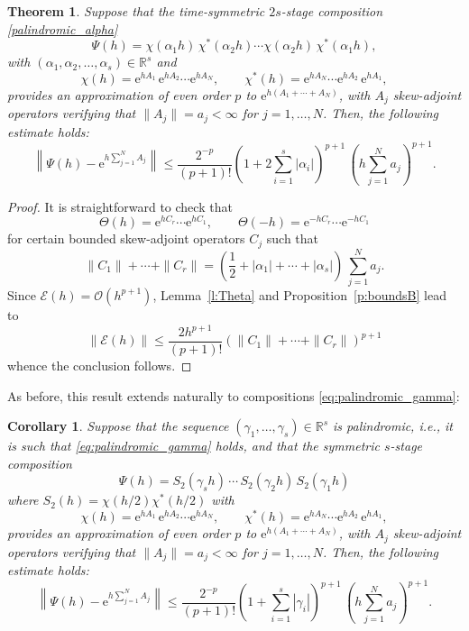 \documentclass[11pt]{article}
\newcommand{\e}{\ensuremath{\mathrm{e}}}
\newtheorem{theorem}[lemma]{Theorem}
\newtheorem{corollary}[lemma]{Corollary}
\begin{document}
\begin{theorem} \label{th_compo}
Suppose that the time-symmetric $2s$-stage composition \eqref{palindromic_alpha} 
\[
   \Psi(h) = \chi(\alpha_{1} h) \, \chi^*(\alpha_{2} h) \cdots \chi(\alpha_2 h) \, \chi^*(\alpha_1 h), 
\]
with $(\alpha_1, \alpha_2, \ldots, \alpha_s) \in \mathbb{R}^s$ and
\[
  \chi(h) = \e^{h A_1} \, \e^{h A_2} \cdots \e^{h A_N}, \qquad \chi^*(h) = \e^{h A_N} \cdots \e^{h A_2} \, \e^{h A_1}, 
\]
 provides an approximation of even order $p$ to $\e^{h(A_1 + \cdots + A_N)}$,
with $A_j$ skew-adjoint operators verifying that $\|A_j\| = a_j < \infty$ for $j=1,\ldots, N$. Then, the following estimate holds:
\begin{equation*} 
  \left\|\Psi(h)-\e^{h \sum_{j=1}^N A_j} \right\| \le \frac{2^{-p}}{(p+1)!} \left( 1+ 2 \sum_{i=1}^s |\alpha_i| \right)^{p+1}  \, \left(h \sum_{j=1}^N a_j \right)^{p+1}.
\end{equation*}
\end{theorem}

\begin{proof}
It is straightforward to check that 
\[
\Theta(h)=\e^{h C_r} \cdots \e^{h C_1}, \qquad 
\Theta(-h) = \e^{-h C_r} \cdots \e^{-h C_1}
\]
 for certain bounded skew-adjoint operators $C_j$ such that 
\begin{equation*}
\|C_1\|+\cdots+\|C_r\|  = \left( \frac{1}{2} + |\alpha_1|+\cdots+|\alpha_s| \right) \, \sum_{j=1}^N a_j.
\end{equation*}
Since $\mathcal{E}(h) = \mathcal{O}(h^{p+1})$, Lemma~\ref{l:Theta} and Proposition~\ref{p:boundsB} lead to
\[
  \|\mathcal{E}(h)\| \le  \frac{2 h^{p+1}}{(p+1)!} \left( \|C_1\|+\cdots+\|C_r\| \right)^{p+1}
 \]
 whence the conclusion follows. 
\end{proof}
As before, this result extends naturally to compositions \eqref{eq:palindromic_gamma}:

\begin{corollary} \label{th_compo_sym}
Suppose that the sequence $(\gamma_1, \ldots, \gamma_s) \in \mathbb{R}^s$ is palindromic, i.e., it is such that \eqref{eq:palindromic_gamma} holds, and that the symmetric $s$-stage composition 
\[
  \Psi(h) = S_2(\gamma_s h) \,  \cdots \, S_2(\gamma_2 h) \, S_2(\gamma_1 h)
\]
where $S_2(h) = \chi(h/2) \chi^*(h/2)$ with
\[
  \chi(h) = \e^{h A_1} \, \e^{h A_2} \cdots \e^{h A_N}, \qquad \chi^*(h) = \e^{h A_N} \cdots \e^{h A_2} \, \e^{h A_1}, 
\]
 provides an approximation of even order $p$ to $\e^{h(A_1 + \cdots + A_N)}$,
with $A_j$ skew-adjoint operators verifying that $\|A_j\| = a_j < \infty$ for $j=1,\ldots, N$. Then, the following estimate holds:
\begin{equation*} 
  \left\|\Psi(h)-\e^{h \sum_{j=1}^N A_j} \right\| \le \frac{2^{-p}}{(p+1)!} \left( 1+ \sum_{i=1}^s |\gamma_i| \right)^{p+1}  \, \left(h \sum_{j=1}^N a_j \right)^{p+1}.
\end{equation*}
\end{corollary}
\end{document}
